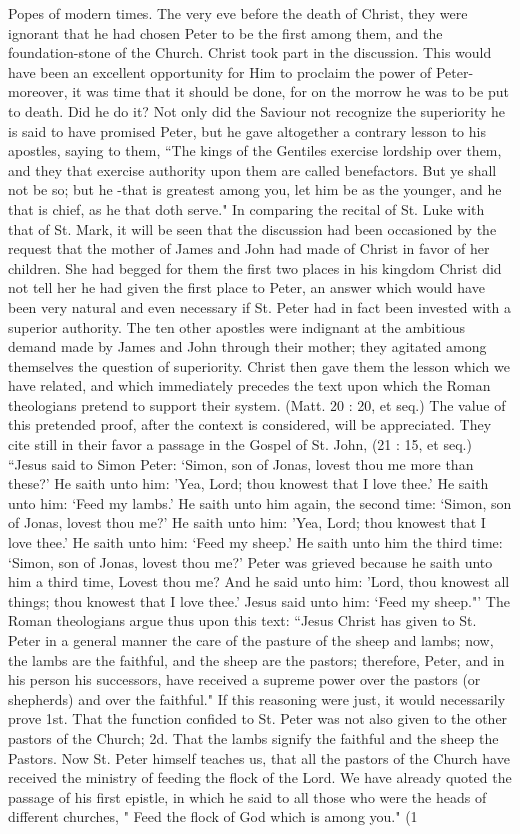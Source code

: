Popes of modern times. The very eve before the death of Christ, they were ignorant that he had chosen Peter to be the first among them, and the foundation-stone of the Church. Christ took part in the discussion. This would have been an excellent opportunity for Him to proclaim the power of Peter-moreover, it was time that it should be done, for on the morrow he was to be put to death. Did he do it? Not only did the Saviour not recognize the superiority he is said to have promised Peter, but he gave altogether a contrary lesson to his apostles, saying to them, “The kings of the Gentiles exercise lordship over them, and they that exercise authority upon them are called benefactors. But ye shall not be so; but he -that is greatest among you, let him be as the younger, and he that is chief, as he that doth serve." In comparing the recital of St. Luke with that of St. Mark, it will be seen that the discussion had been occasioned by the request that the mother of James and John had made of Christ in favor of her children. She had begged for them the first two places in his kingdom Christ did not tell her he had given the first place to Peter, an answer which would have been very natural and even necessary if St. Peter had in fact been invested with a superior authority. The ten other apostles were indignant at the ambitious demand made by James and John through their mother; they agitated among themselves the question of superiority. Christ then gave them the lesson which we have related, and which immediately precedes the text upon which the Roman theologians pretend to support their system. (Matt. 20 : 20, et seq.) The value of this pretended proof, after the context is considered, will be appreciated. They cite still in their favor a passage in the Gospel of St. John, (21 : 15, et seq.) “Jesus said to Simon Peter: ‘Simon, son of Jonas, lovest thou me more than these?' He saith unto him: 'Yea, Lord; thou knowest that I love thee.' He saith unto him: ‘Feed my lambs.' He saith unto him again, the second time: ‘Simon, son of Jonas, lovest thou me?' He saith unto him: 'Yea, Lord; thou knowest that I love thee.' He saith unto him: ‘Feed my sheep.' He saith unto him the third time: ‘Simon, son of Jonas, lovest thou me?' Peter was grieved because he saith unto him a third time, Lovest thou me? And he said unto him: 'Lord, thou knowest all things; thou knowest that I love thee.' Jesus said unto him: ‘Feed my sheep."' The Roman theologians argue thus upon this text: “Jesus Christ has given to St. Peter in a general manner the care of the pasture of the sheep and lambs; now, the lambs are the faithful, and the sheep are the pastors; therefore, Peter, and in his person his successors, have received a supreme power over the pastors (or shepherds) and over the faithful." If this reasoning were just, it would necessarily prove 1st. That the function confided to St. Peter was not also given to the other pastors of the Church; 2d. That the lambs signify the faithful and the sheep the Pastors. Now St. Peter himself teaches us, that all the pastors of the Church have received the ministry of feeding the flock of the Lord. We have already quoted the passage of his first epistle, in which he said to all those who were the heads of different churches, " Feed the flock of God which is among you." (1 